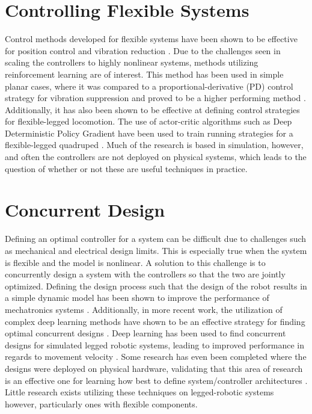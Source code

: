 \section{Controlling Flexible Systems}
Control methods developed for flexible systems have been shown to be effective for position control and vibration reduction \cite{Luo1993, Ahmadi1997}. Due to the challenges seen in scaling the controllers to highly nonlinear systems, methods utilizing reinforcement learning are of interest. This method has been used in simple planar cases, where it was compared to a proportional-derivative (PD) control strategy for vibration suppression and proved to be a higher performing method \cite{He2020f}. Additionally, it has also been shown to be effective at defining control strategies for flexible-legged locomotion. The use of actor-critic algorithms such as Deep Deterministic Policy Gradient \cite{Lillicrap2016h} have been used to train running strategies for a flexible-legged quadruped \cite{Dwiel2019d}. Much of the research is based in simulation, however, and often the controllers are not deployed on physical systems, which leads to the question of whether or not these are useful techniques in practice. 

\section{Concurrent Design}
Defining an optimal controller for a system can be difficult due to challenges such as mechanical and electrical design limits. This is especially true when the system is flexible and the model is nonlinear. A solution to this challenge is to concurrently design a system with the controllers so that the two are jointly optimized. Defining the design process such that the design of the robot results in a simple dynamic model has been shown to improve the performance of mechatronics systems \cite{Li2001}. Additionally, in more recent work, the utilization of complex deep learning methods have shown to be an effective strategy for finding optimal concurrent designs \cite{Chen2020}. Deep learning has been used to find concurrent designs for simulated legged robotic systems, leading to improved performance in regards to movement velocity \cite{Schaff2019e}. Some research has even been completed where the designs were deployed on physical hardware, validating that this area of research is an effective one for learning how best to define system/controller architectures \cite{Whitman2020}. Little research exists utilizing these techniques on legged-robotic systems however, particularly ones with flexible components. 

